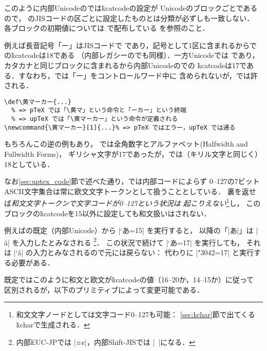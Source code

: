 \documentclass[a4paper,11pt,nomag,dvipdfmx]{jsarticle}
\begin{document}
このように内部Unicodeの\upTeX では\.{kcatcode}の設定が
Unicodeのブロックごとであるので，
\pTeX のJISコードの区ごとに設定したものとは分類が必ずしも一致しない．
各ブロックの初期値については
\href{https://github.com/texjporg/uptex-base}{}で配布している
を参照のこと．
\begin{dangerous}
例えば長音記号「ー」はJISコードで%
であり，記号として1区に含まれるから\pTeX での\.{kcatcode}は18である
（内部レガシーの\upTeX でも同様）．一方Unicodeでは%
であり，カタカナと同じブロックに含まれるから内部Unicodeの\upTeX での
\.{kcatcode}は17である．すなわち，\pTeX では「ー」をコントロールワード中に
含められないが，\upTeX では許される．
\begin{verbatim}
\def\黄マーカー{...}
  % => pTeX では「\黄マ」という命令と「ーカー」という終端
  % => upTeX では「\黄マーカー」という命令が定義される
\newcommand{\黄マーカー}[1]{...}% => pTeX ではエラー，upTeX では通る
\end{verbatim}
もちろんこの逆の例もあり，
\pTeX では全角数字とアルファベット(Halfwidth and Fullwidth Forms)，
ギリシャ文字が17であったが，\upTeX では（キリル文字と同じく）18としている．
\end{dangerous}

なお\ref{sec:uptex_code}節で述べた通り，\upTeX では内部コードによらず
0--127の7ビットASCII文字集合は常に欧文文字トークンとして扱うこととしている．
裏を返せば\emph{和文文字トークンで文字コードが0--127という状況は
起こりえない}\footnote{和文文字ノードとしては文字コード0--127も可能：
\ref{sec:kchar}節で出てくる\.{kchar}で生成される．}し，
このブロックの\.{kcatcode}を15以外に設定しても和文扱いはされない．
\begin{dangerous}
例えば\upTeX の既定（内部Unicode）から |\kcatcode`あ=15| を実行すると，
以降の「|あ|\relax」は |^^e3^^81^^82| を入力したとみなされる
\footnote{内部EUC-JPでは |^^a4^^a2|，内部Shift-JISでは |^^82^^a0|になる．}．
この状況で続けて |\kcatcode`あ=17| を実行しても，
それは |\kcatcode`^^e3^^81^^82| の入力とみなされるので元には戻らない：
代わりに |\kcatcode\ucs"3042=17| と実行する必要がある．
\end{dangerous}

既定ではこのように和文と欧文が\.{kcatcode}の値（16--20か，14--15か）に従って
区別されるが，以下のプリミティブによって変更可能である．
\end{document}
